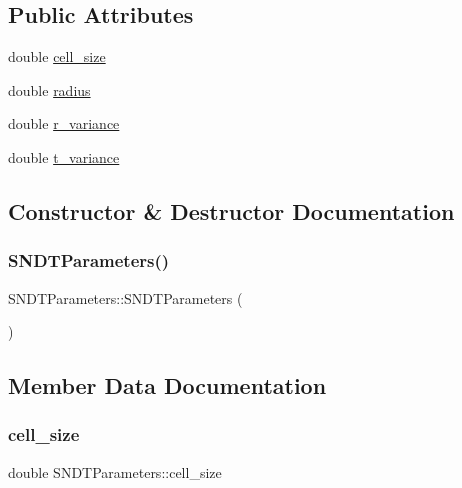 \subsection*{Public Attributes}
\begin{DoxyCompactItemize}
\item 
double \hyperlink{structSNDTParameters_aa59f6c2fc54ecfcc8c5168840e26d198}{cell\+\_\+size}
\item 
double \hyperlink{structSNDTParameters_a031a9440acf67e6b3d9dad08c8af2562}{radius}
\item 
double \hyperlink{structSNDTParameters_a3d9f72a08ba03884c82e5143c5fd24eb}{r\+\_\+variance}
\item 
double \hyperlink{structSNDTParameters_aa138682632a0ad7d1ccf8cfe0b1f5b0b}{t\+\_\+variance}
\end{DoxyCompactItemize}


\subsection{Constructor \& Destructor Documentation}
\mbox{\label{structSNDTParameters_a8e838a0dcf9f93394f533d14ab8eda0a}} 
\subsubsection{\texorpdfstring{S\+N\+D\+T\+Parameters()}{SNDTParameters()}}
{\footnotesize\ttfamily S\+N\+D\+T\+Parameters\+::\+S\+N\+D\+T\+Parameters (\begin{DoxyParamCaption}{ }\end{DoxyParamCaption})\hspace{0.3cm}{\ttfamily [inline]}}



\subsection{Member Data Documentation}
\mbox{\label{structSNDTParameters_aa59f6c2fc54ecfcc8c5168840e26d198}} 
\subsubsection{\texorpdfstring{cell\+\_\+size}{cell\_size}}
{\footnotesize\ttfamily double S\+N\+D\+T\+Parameters\+::cell\+\_\+size}



